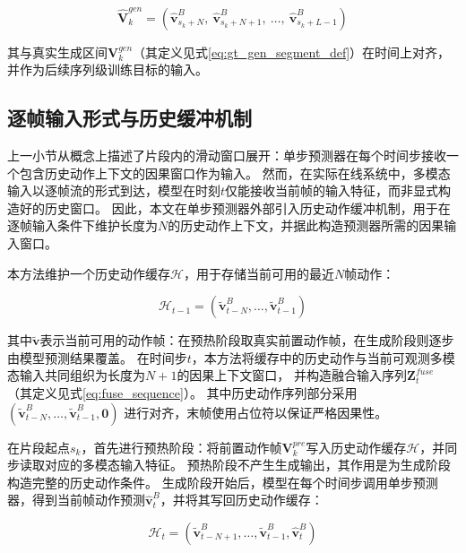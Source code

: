 \begin{equation}
\hat{\bm{V}}_k^{gen}
=
(\hat{\bm{v}}_{s_k+N}^B,\ \hat{\bm{v}}_{s_k+N+1}^B,\ \ldots,\ \hat{\bm{v}}_{s_k+L-1}^B)
\label{eq:generated_segment}
\end{equation}

其与真实生成区间$\bm{V}_k^{gen}$（其定义见式\eqref{eq:gt_gen_segment_def}）在时间上对齐，并作为后续序列级训练目标的输入。

\subsection{逐帧输入形式与历史缓冲机制}
\label{subsec:streaming_buffer}

上一小节从概念上描述了片段内的滑动窗口展开：单步预测器在每个时间步接收一个包含历史动作上下文的因果窗口作为输入。
然而，在实际在线系统中，多模态输入以逐帧流的形式到达，模型在时刻$t$仅能接收当前帧的输入特征，而非显式构造好的历史窗口。
因此，本文在单步预测器外部引入历史动作缓冲机制，用于在逐帧输入条件下维护长度为$N$的历史动作上下文，并据此构造预测器所需的因果输入窗口。

本方法维护一个历史动作缓存$\mathcal{H}$，用于存储当前可用的最近$N$帧动作：

\begin{equation}
\mathcal{H}_{t-1} = (\tilde{\bm{v}}_{t-N}^{B}, \ldots, \tilde{\bm{v}}_{t-1}^{B})
\label{eq:history_buffer_stream}
\end{equation}

其中$\tilde{\bm{v}}$表示当前可用的动作帧：在预热阶段取真实前置动作帧，在生成阶段则逐步由模型预测结果覆盖。
在时间步$t$，本方法将缓存中的历史动作与当前可观测多模态输入共同组织为长度为$N{+}1$的因果上下文窗口，
并构造融合输入序列$\bm{Z}_t^{fuse}$（其定义见式\eqref{eq:fuse_sequence}）。
其中历史动作序列部分采用
$(\tilde{\bm{v}}_{t-N}^{B}, \ldots, \tilde{\bm{v}}_{t-1}^{B}, \mathbf{0})$
进行对齐，末帧使用占位符以保证严格因果性。

在片段起点$s_k$，首先进行预热阶段：将前置动作帧$\bm{V}_k^{pre}$写入历史动作缓存$\mathcal{H}$，并同步读取对应的多模态输入特征。
预热阶段不产生生成输出，其作用是为生成阶段构造完整的历史动作条件。
生成阶段开始后，模型在每个时间步调用单步预测器，得到当前帧动作预测$\hat{\bm{v}}_{t}^{B}$，并将其写回历史动作缓存：

\begin{equation}
\mathcal{H}_{t} = (\tilde{\bm{v}}_{t-N+1}^{B}, \ldots, \tilde{\bm{v}}_{t-1}^{B}, \hat{\bm{v}}_{t}^{B})
\label{eq:history_update_stream}
\end{equation}

